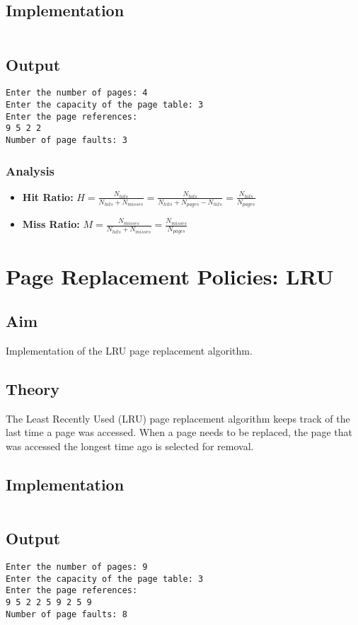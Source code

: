 \subsection{Implementation}

\inputminted[fontsize=\footnotesize]{c}{code/page_fifo.c}

\subsection{Output}
\begin{lstlisting}[style=output]
Enter the number of pages: 4
Enter the capacity of the page table: 3
Enter the page references:
9 5 2 2
Number of page faults: 3
\end{lstlisting}

\subsubsection{Analysis}

\begin{itemize}
	\item \textbf{Hit Ratio:} $H = \frac{N_{hits}}{N_{hits} + N_{misses}} = \frac{N_{hits}}{N_{hits} + N_{pages} - N_{hits}} = \frac{N_{hits}}{N_{pages}}$
	\item \textbf{Miss Ratio:} $M = \frac{N_{misses}}{N_{hits} + N_{misses}} = \frac{N_{misses}}{N_{pages}}$
\end{itemize}


\section{Page Replacement Policies: LRU}
\label{sec:page-replacement-lru}

\subsection{Aim}
Implementation of the LRU page replacement algorithm.

\subsection{Theory}
The Least Recently Used (LRU) page replacement algorithm
keeps track of the last time a page was accessed.
When a page needs to be replaced, the page that was accessed the longest time ago is selected for removal.

\subsection{Implementation}

\inputminted[fontsize=\footnotesize]{c}{code/page_lru.c}

\subsection{Output}
\begin{lstlisting}[style=output]
Enter the number of pages: 9
Enter the capacity of the page table: 3
Enter the page references:
9 5 2 2 5 9 2 5 9
Number of page faults: 8
\end{lstlisting}
